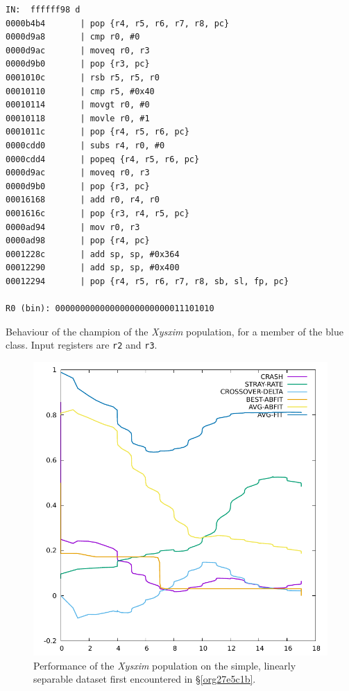\documentclass[12pt,glossary]{dalthesis}
\begin{document}
\begin{table}
\begin{lstlisting}
IN:  ffffff98 d
0000b4b4       | pop {r4, r5, r6, r7, r8, pc}
0000d9a8       | cmp r0, #0
0000d9ac       | moveq r0, r3
0000d9b0       | pop {r3, pc}
0001010c       | rsb r5, r5, r0
00010110       | cmp r5, #0x40
00010114       | movgt r0, #0
00010118       | movle r0, #1
0001011c       | pop {r4, r5, r6, pc}
0000cdd0       | subs r4, r0, #0
0000cdd4       | popeq {r4, r5, r6, pc}
0000d9ac       | moveq r0, r3
0000d9b0       | pop {r3, pc}
00016168       | add r0, r4, r0
0001616c       | pop {r3, r4, r5, pc}
0000ad94       | mov r0, r3
0000ad98       | pop {r4, pc}
0001228c       | add sp, sp, #0x364
00012290       | add sp, sp, #0x400
00012294       | pop {r4, r5, r6, r7, r8, sb, sl, fp, pc}

R0 (bin): 00000000000000000000000011101010
\end{lstlisting}
\caption{Behaviour of the champion of the \emph{Xysxim} population, for a member of the blue class. Input registers are \texttt{r2} and \texttt{r3}.}
\label{tab:xysxim-champ-blue}
\end{table}

\begin{figure}[htbp]
\centering
\includegraphics[width=.9\linewidth]{../images/plots/xysxim.pdf}
\caption{\label{fig:org3ffded6}
Performance of the \emph{Xysxim} population on the simple, linearly separable dataset first encountered in \S \ref{org27e5c1b}.}
\end{figure}
\end{document}
